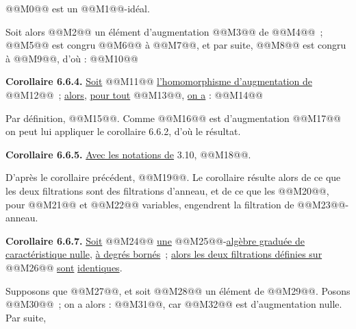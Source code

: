 
@@M0@@ est un @@M1@@-idéal.

Soit alors @@M2@@ un élément d'augmentation @@M3@@ de @@M4@@~; @@M5@@ est congru @@M6@@ à @@M7@@, et par suite, @@M8@@ est congru à @@M9@@, d'où :
@@M10@@

\textbf{Corollaire 6.6.4.} \uline{Soit} @@M11@@ \uline{l'homomorphisme d'augmentation de} @@M12@@~; \uline{alors}, \uline{pour tout} @@M13@@, \uline{on a} :
@@M14@@

Par définition, @@M15@@. Comme @@M16@@ est d'augmentation @@M17@@ on peut lui appliquer le corollaire 6.6.2, d'où le résultat.

\textbf{Corollaire 6.6.5.} \uline{Avec les notations de} 3.10, @@M18@@.

D'après le corollaire précédent, @@M19@@. Le corollaire résulte alors de ce que les deux filtrations sont des filtrations d'anneau, et de ce que les @@M20@@, pour @@M21@@ et @@M22@@ variables, engendrent la filtration de @@M23@@-anneau.

\textbf{Corollaire 6.6.7.} \uline{Soit} @@M24@@ \uline{une} @@M25@@-\uline{algèbre graduée de caractéristique nulle}, \uline{à degrés bornés}~; \uline{alors les deux filtrations définies sur} @@M26@@ \uline{sont} \uline{identiques}.

Supposons que @@M27@@, et soit @@M28@@ un élément de @@M29@@. Posons @@M30@@~; on a alors :
@@M31@@, car @@M32@@ est d'augmentation nulle. Par suite, 
